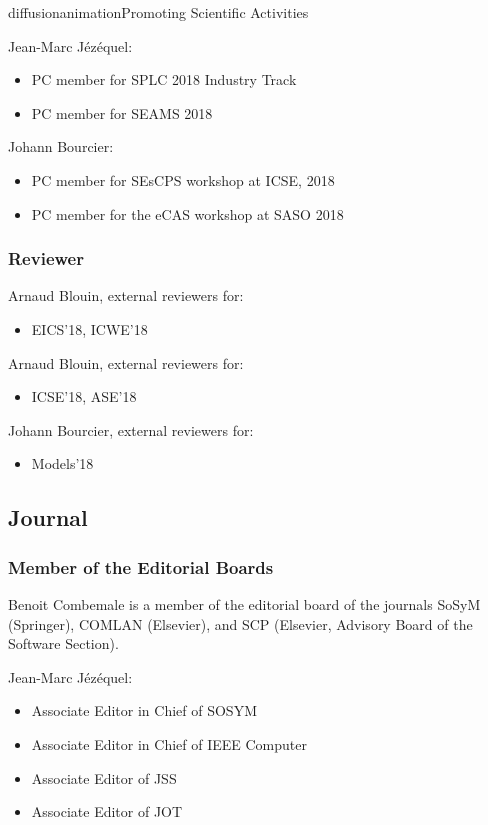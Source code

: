 \documentclass{ra2018}
\begin{document}
\begin{module}{diffusion}{animation}{Promoting Scientific Activities}
    
Jean-Marc J\'ez\'equel:
    \begin{itemize}
    	\item PC member for SPLC 2018 Industry Track
    	\item PC member for SEAMS 2018
    \end{itemize}

Johann Bourcier:
\begin{itemize}
	\item PC member for SEsCPS workshop at ICSE, 2018
	\item PC member for the eCAS workshop at SASO 2018
\end{itemize}
    
    \subsubsection{Reviewer}

 Arnaud Blouin, external reviewers for:
\begin{itemize}
    \item EICS'18, ICWE'18
\end{itemize}    

Arnaud Blouin, external reviewers for:
  \begin{itemize}
   	\item ICSE'18, ASE'18
  \end{itemize}   

Johann Bourcier, external reviewers for:
\begin{itemize}
	\item Models'18
\end{itemize}   

\subsection{Journal}
    \subsubsection{Member of the Editorial Boards}

Benoit Combemale is a member of the editorial board of the journals SoSyM (Springer), COMLAN (Elsevier), and SCP (Elsevier, Advisory Board of the Software Section).    
    
    Jean-Marc J\'ez\'equel:
    \begin{itemize}
    	\item Associate Editor in Chief of SOSYM
    	\item Associate Editor in Chief of IEEE Computer
    	\item Associate Editor of JSS
    	\item Associate Editor of JOT
    \end{itemize}
    

\end{module}
\end{document}
